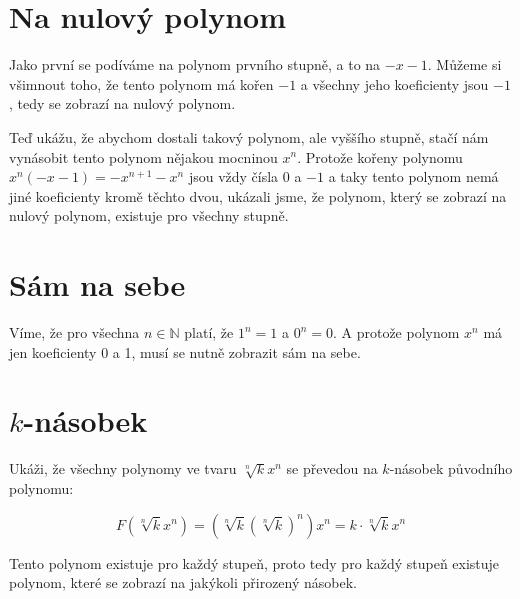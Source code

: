 \documentclass{fkssolpub}
\author{Ondřej Sedláček}
\newcommand{\N}{\mathbb{N}}
\begin{document}
\section{Na nulový polynom}

Jako první se podíváme na polynom prvního stupně, a to na $- x - 1$. Můžeme si všimnout toho, že tento polynom má kořen $-1$ a všechny jeho koeficienty jsou $-1$, tedy se zobrazí na nulový polynom. 

Teď ukážu, že abychom dostali takový polynom, ale vyššího stupně, stačí nám vynásobit tento polynom nějakou mocninou $x^n$. Protože kořeny polynomu $x^n (-x - 1) = -x^{n + 1} - x^n$ jsou vždy čísla 0 a $-1$ a taky tento polynom nemá jiné koeficienty kromě těchto dvou, ukázali jsme, že polynom, který se zobrazí na nulový polynom, existuje pro všechny stupně.

\section{Sám na sebe}

Víme, že pro všechna $n \in \N$ platí, že $1^n = 1$ a $0^n = 0$. A protože polynom $x^n$ má jen koeficienty 0 a 1, musí se nutně zobrazit sám na sebe.

\section{$k$-násobek}

Ukáži, že všechny polynomy ve tvaru $\sqrt[n]{k} x^n$ se převedou na $k$-násobek původního polynomu:

\[
  F(\sqrt[n]{k} x^n) = \left(\sqrt[n]{k} \left(\sqrt[n]{k}\right)^n\right) x^n = k \cdot \sqrt[n]{k} x^n
\]

Tento polynom existuje pro každý stupeň, proto tedy pro každý stupeň existuje polynom, které se zobrazí na jakýkoli přirozený násobek.
\end{document}
